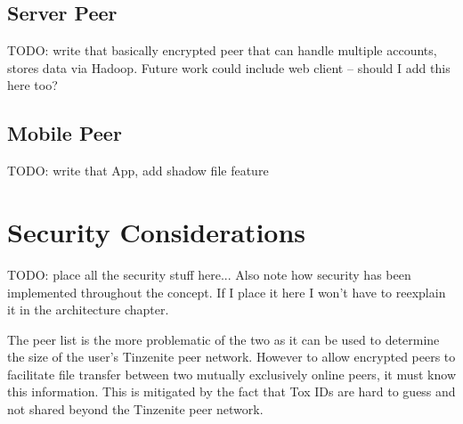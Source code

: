 \subsection{Server Peer}

TODO: write that basically encrypted peer that can handle multiple accounts, stores data via Hadoop.
Future work could include web client – should I add this here too?

\subsection{Mobile Peer}

TODO: write that App, add shadow file feature

\section{Security Considerations}
\label{sec:Security Considerations}

TODO: place all the security stuff here...
Also note how security has been implemented throughout the concept.
If I place it here I won't have to reexplain it in the architecture chapter.

The peer list is the more problematic of the two as it can be used to determine the size of the user's Tinzenite peer network.
However to allow encrypted peers to facilitate file transfer between two mutually exclusively online peers, it must know this information.
This is mitigated by the fact that Tox IDs are hard to guess and not shared beyond the Tinzenite peer network.
